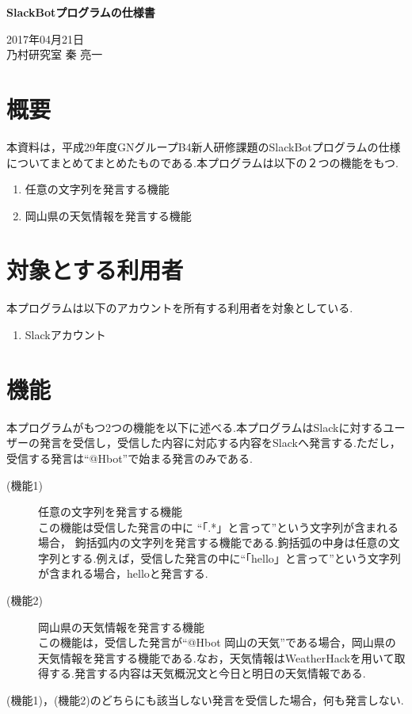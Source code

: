 \documentclass[fleqn, 14pt]{sty/extarticlej}
\begin{document}
\begin{center}
{\Large {\bf SlackBotプログラムの仕様書}}

\end{center}
\begin{flushright}
2017年04月21日\\

乃村研究室 秦 亮一
\end{flushright}
\section{概要}
本資料は，平成29年度GNグループB4新人研修課題のSlackBotプログラムの仕様についてまとめてまとめたものである.本プログラムは以下の２つの機能をもつ.
\begin{enumerate}
\item 任意の文字列を発言する機能
\item 岡山県の天気情報を発言する機能
\end{enumerate}
\section{対象とする利用者}
本プログラムは以下のアカウントを所有する利用者を対象としている.
\begin{enumerate}
\item Slackアカウント
\end{enumerate}
\section{機能}
本プログラムがもつ2つの機能を以下に述べる.本プログラムはSlackに対するユーザーの発言を受信し，受信した内容に対応する内容をSlackへ発言する.ただし，受信する発言は``@Hbot''で始まる発言のみである.
\begin{description}
\item[(機能1)] 任意の文字列を発言する機能\\
  この機能は受信した発言の中に ``「.*」と言って''という文字列が含まれる場合， 鉤括弧内の文字列を発言する機能である.鉤括弧の中身は任意の文字列とする.例えば，受信した発言の中に``「hello」と言って''という文字列が含まれる場合，helloと発言する.
\item[(機能2)] 岡山県の天気情報を発言する機能\\
  この機能は，受信した発言が``@Hbot 岡山の天気''である場合，岡山県の天気情報を発言する機能である.なお，天気情報はWeatherHack\cite{ITR}を用いて取得する.発言する内容は天気概況文と今日と明日の天気情報である.\\
\end{description}
(機能1)，(機能2)のどちらにも該当しない発言を受信した場合，何も発言しない.
\end{document}
